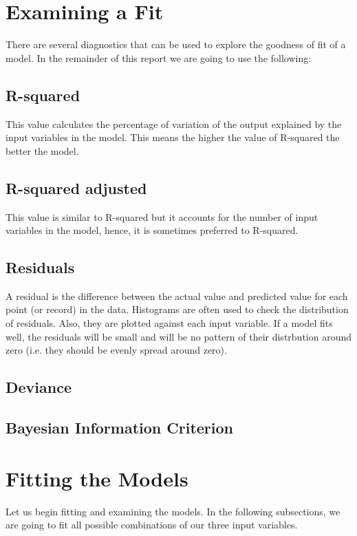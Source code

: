 \documentclass[a4paper,12pt, english]{article}
\begin{document}
\section{Examining a Fit}
There are several diagnostics that can be used to explore the goodness of fit of a model. In the remainder of this report we are going to use the following:
\subsection{R-squared}
This value calculates the percentage of variation of the output explained by the input variables in the model. This means the higher the value of R-squared the better the model. 
\subsection{R-squared adjusted}
This value is similar to R-squared but it accounts for the number of input variables in the model, hence, it is sometimes preferred to R-squared.
\subsection{Residuals}
A residual is the difference between the actual value and predicted value for each point (or record) in the data. Histograms are often used to check the distribution of residuals. Also, they are plotted against each input variable. If a model fits well, the residuals will be small and will be no pattern of their distrbution around zero (i.e. they should be evenly spread around zero).
\subsection{Deviance}
\subsection{Bayesian Information Criterion}

\section{Fitting the Models}
Let us begin fitting and examining the models. In the following subsections, we are going to fit all possible combinations of our three input variables.
\end{document}
